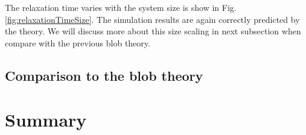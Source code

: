 The relaxation time varies with the system size is show in Fig. \ref{fig:relaxationTimeSize}. The simulation results are again correctly predicted by the theory. We will discuss more about this size scaling in next subsection when compare with the previous blob theory. 

\subsection{Comparison to the blob theory}
\label{sub:comparison_to_the_blob_theory}



\section{Summary}
\label{sec:summary}
